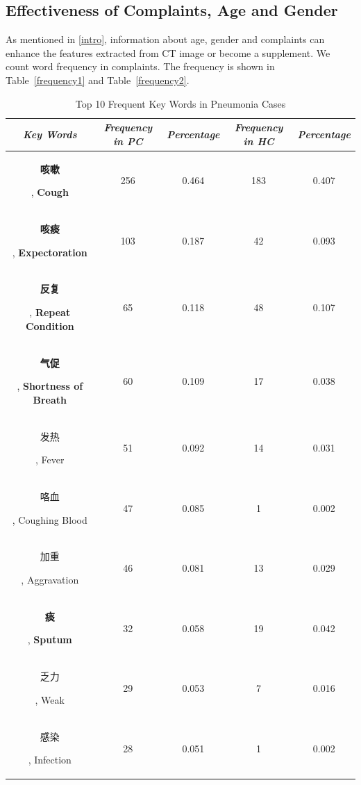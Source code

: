 \documentclass[journal]{IEEEtran}
\begin{document}
\subsection{Effectiveness of Complaints, Age and Gender}
\label{complaintsagegender}
As mentioned in \ref{intro}, information about age, gender and complaints can enhance the features extracted from CT image or become a supplement. We count word frequency in complaints. The frequency is shown in Table~\ref{frequency1} and Table~\ref{frequency2}.


\begin{table}[htb]
    \vspace{-0cm}
    \caption{Top 10 Frequent Key Words in Pneumonia Cases}
    \vspace{-0cm}
    \begin{center}
    \begin{tabular}{|c|c|c|c|c|}
        \hline
        \textbf{\textit{Key Words}} & \textbf{\textit{Frequency in PC}} & \textbf{\textit{Percentage}}& \textbf{\textit{Frequency in HC}}& \textbf{\textit{Percentage}} \\
    \hline
    \begin{CJK}{UTF8}{gbsn}\textbf{咳嗽}\end{CJK}, \textbf{Cough} & 256 & 0.464 & 183 & 0.407\\
    \begin{CJK}{UTF8}{gbsn}\textbf{咳痰}\end{CJK}, \textbf{Expectoration} & 103 & 0.187 & 42 & 0.093\\
    \begin{CJK}{UTF8}{gbsn}\textbf{反复}\end{CJK}, \textbf{Repeat Condition} & 65 & 0.118 & 48 & 0.107\\
    \begin{CJK}{UTF8}{gbsn}\textbf{气促}\end{CJK}, \textbf{Shortness of Breath} & 60 & 0.109 & 17 & 0.038\\
    \begin{CJK}{UTF8}{gbsn}发热\end{CJK}, Fever & 51 & 0.092 & 14 & 0.031\\
    \begin{CJK}{UTF8}{gbsn}咯血\end{CJK}, Coughing Blood & 47 & 0.085 & 1 & 0.002\\
    \begin{CJK}{UTF8}{gbsn}加重\end{CJK}, Aggravation & 46 & 0.081 & 13 & 0.029\\
    \begin{CJK}{UTF8}{gbsn}\textbf{痰}\end{CJK}, \textbf{Sputum} & 32 & 0.058 & 19 & 0.042\\
    \begin{CJK}{UTF8}{gbsn}乏力\end{CJK}, Weak& 29 & 0.053 & 7 & 0.016\\
    \begin{CJK}{UTF8}{gbsn}感染\end{CJK}, Infection& 28 & 0.051 & 1 & 0.002\\
    

\end{tabular}
\end{center}
\end{table}
\end{document}
